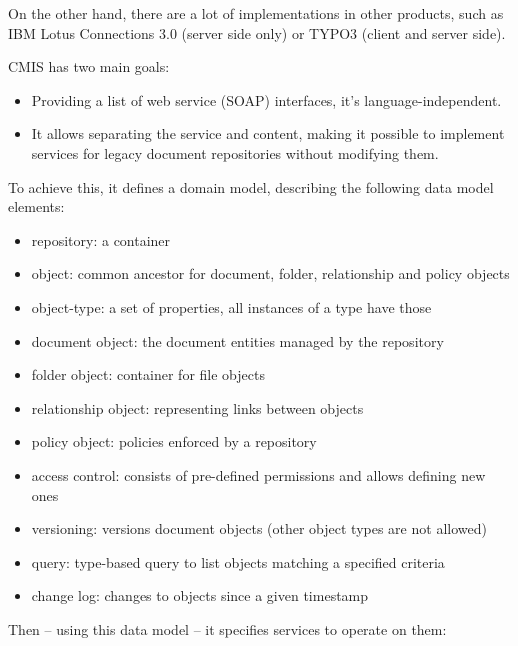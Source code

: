 On the other hand, there are a lot of implementations in other products, such
as IBM Lotus Connections 3.0\cite{lotus} (server side only) or TYPO3 (client
and server side).

CMIS has two main goals:

\begin{itemize}
\item Providing a list of web service (SOAP) interfaces, it's language-independent.
\item It allows separating the service and content, making it possible to
implement services for legacy document repositories without modifying them.
\end{itemize}

To achieve this, it defines a domain model, describing the following data model
elements:

\begin{itemize}
\item repository: a container
\item object: common ancestor for document, folder, relationship and policy objects
\item object-type: a set of properties, all instances of a type have those
\item document object: the document entities managed by the repository
\item folder object: container for file objects
\item relationship object: representing links between objects
\item policy object: policies enforced by a repository
\item access control: consists of pre-defined permissions and allows defining new ones
\item versioning: versions document objects (other object types are not allowed)
\item query: type-based query to list objects matching a specified criteria
\item change log: changes to objects since a given timestamp
\end{itemize}

Then -- using this data model -- it specifies services to operate on them:

